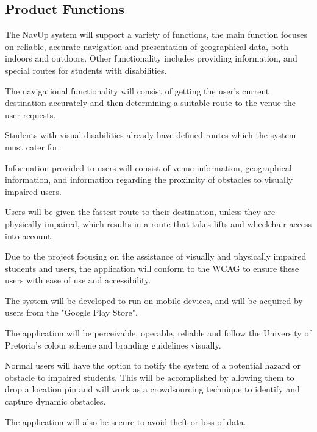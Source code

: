 \documentclass{article}
\begin{document}
	\subsection{Product Functions}
		The NavUp system will support a variety of functions, the main function focuses on reliable, accurate navigation and presentation of geographical data, both indoors and outdoors. Other functionality includes providing information, and special routes for students with disabilities.
		\\ \par
		The navigational functionality will consist of getting the user's current destination accurately and then determining a suitable route to the venue the user requests.\\ \par
		Students with visual disabilities already have defined routes which the system must cater for.\\ \par
		Information provided to users will consist of venue information, geographical information, and information regarding the proximity of obstacles to visually impaired users.\\ \par
		Users will be given the fastest route to their destination, unless they are physically impaired, which results in a route that takes lifts and wheelchair access into account.\\ \par
		Due to the project focusing on the assistance of visually and physically impaired students and users, the application will conform to the WCAG to ensure these users with ease of use and accessibility.\\ \par
		The system will be developed to run on mobile devices, and will be acquired by users from the "Google Play Store".\\ \par
		The application will be perceivable, operable, reliable and follow the University of Pretoria's colour scheme and branding guidelines visually.\\ \par
		Normal users will have the option to notify the system of a potential hazard or obstacle to impaired students. This will be accomplished by allowing them to drop a location pin and will work as a crowdsourcing technique to identify and capture dynamic obstacles. \\ \par
		The application will also be secure to avoid theft or loss of data.
			
\end{document}
